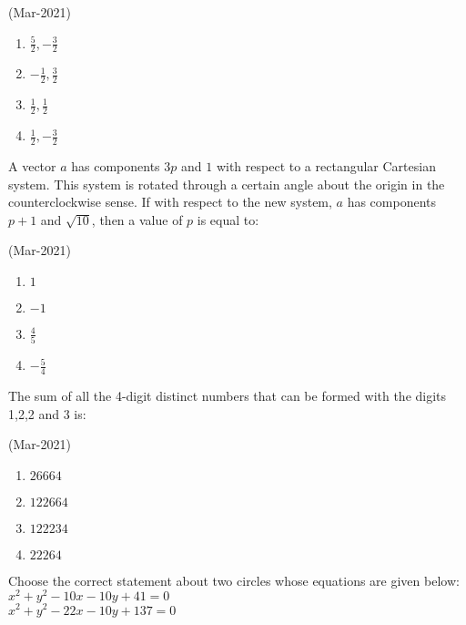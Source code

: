 					\hfill{(Mar-2021)}
					\begin{multicols}{4}
                \begin{enumerate}
    \item $ \frac{5}{2}, -\frac{3}{2} $
    \item $ -\frac{1}{2}, \frac{3}{2} $
    \item $ \frac{1}{2}, \frac{1}{2} $
    \item $ \frac{1}{2}, -\frac{3}{2} $
                \end{enumerate}
					\end{multicols}
	\item
		A vector $a$ has components $3p$ and $1$ with respect to a rectangular Cartesian system. This system is rotated through a certain angle about the origin in the counterclockwise sense. If with respect to the new system, $a$ has components $p+1$ and $\sqrt{10}$, then a value of $p$ is equal to:

			\hfill{(Mar-2021)}
			\begin{multicols}{4}
		\begin{enumerate}
    \item $ 1 $
    \item $ -1 $
    \item $ \frac{4}{5} $
    \item $ -\frac{5}{4} $
                \end{enumerate}
			\end{multicols}
	\item
		The sum of all the 4-digit distinct numbers that can be formed with the digits 1,2,2 and 3 is:

			\hfill{(Mar-2021)}
			\begin{multicols}{2}
		\begin{enumerate}
    \item $ 26664 $
    \item $ 122664 $
    \item $ 122234 $
    \item $ 22264 $
                \end{enumerate}
			\end{multicols}
	\item
                Choose the correct statement about two circles whose equations are given below:\\
$ x^2 + y^2 - 10x - 10y + 41 = 0 $\\
$ x^2 + y^2 - 22x - 10y + 137 = 0 $\\

